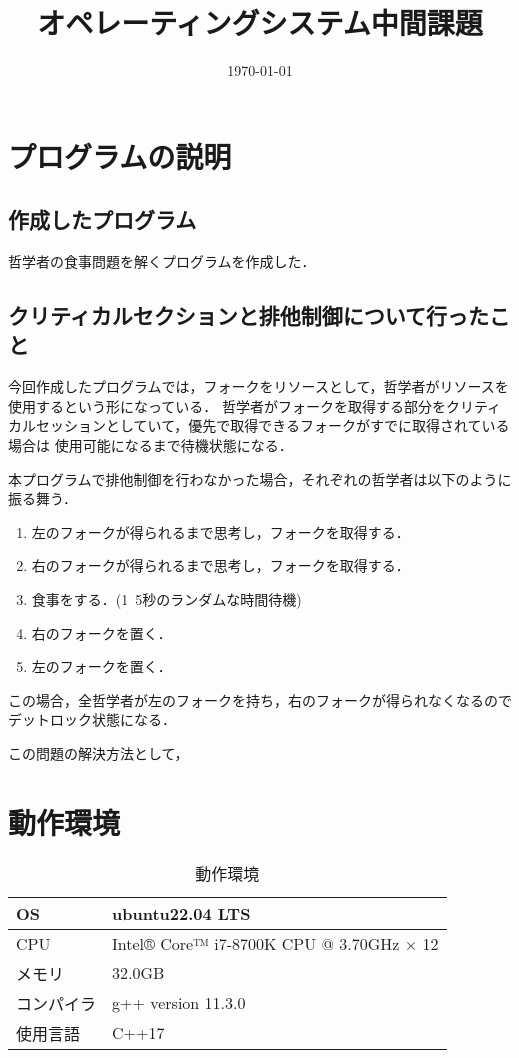 \documentclass[a4paper,dvipdfmx]{jsarticle}
\begin{document}
\title{オペレーティングシステム中間課題}
\author{}
\date{\today}
\maketitle
\section{プログラムの説明}
    \subsection{作成したプログラム}
        哲学者の食事問題を解くプログラムを作成した．
    \subsection{クリティカルセクションと排他制御について行ったこと}
        今回作成したプログラムでは，フォークをリソースとして，哲学者がリソースを使用するという形になっている．
        哲学者がフォークを取得する部分をクリティカルセッションとしていて，優先で取得できるフォークがすでに取得されている場合は
        使用可能になるまで待機状態になる．\par
        本プログラムで排他制御を行わなかった場合，それぞれの哲学者は以下のように振る舞う．
        \begin{enumerate}
            \item 左のフォークが得られるまで思考し，フォークを取得する．
            \item 右のフォークが得られるまで思考し，フォークを取得する．
            \item 食事をする．(1~5秒のランダムな時間待機)
            \item 右のフォークを置く．
            \item 左のフォークを置く．
         \end{enumerate}
         この場合，全哲学者が左のフォークを持ち，右のフォークが得られなくなるのでデットロック状態になる．\par
         この問題の解決方法として，

\section{動作環境}
    \begin{table}[hbtp]
        \caption{動作環境}
        \label{table:env}
        \centering
        \begin{tabular}{|l|l|}
        \hline \hline
        OS  & ubuntu22.04 LTS\\\hline
        CPU  & Intel® Core™ i7-8700K CPU @ 3.70GHz × 12\\\hline
        メモリ  & 32.0GB \\\hline
        コンパイラ  &  g++ version 11.3.0\\\hline
        使用言語  &  C++17\\
        \hline \hline
        \end{tabular}
    \end{table}
\end{document}
